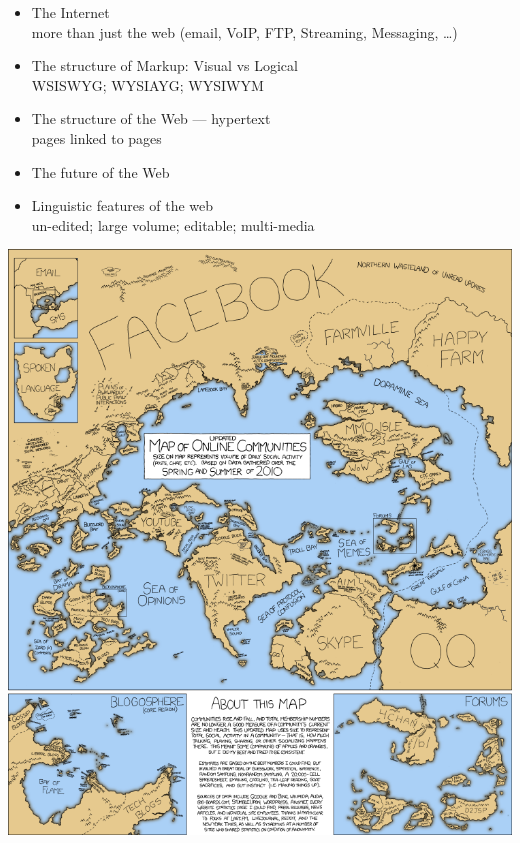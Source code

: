 \documentclass[a4paper,landscape,headrule,footrule,xetex]{foils}
\begin{document}


\maketitle




\begin{itemize}
\item The Internet
   \\ more than just the web (email, VoIP, FTP, Streaming, Messaging, \ldots)
\item The structure of Markup: Visual vs Logical
  \\ WSISWYG; WYSIAYG; WYSIWYM
\item The structure of the Web --- hypertext
\\ pages linked to pages
\item The future of the Web
\item Linguistic features of the web
 \\ un-edited; large volume; editable; multi-media
\end{itemize}


\begin{center}
  \includegraphics[height=\textheight]{../pics/online_communities_2}
\end{center}
\end{document}
